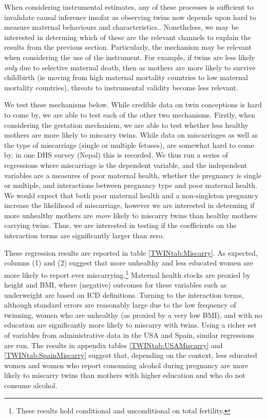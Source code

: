 \documentclass[subeqn]{article}
\begin{document}
\begin{spacing}{1.4}
When considering instrumental estimates, any of these processes is sufficient to
invalidate causal inference insofar as observing twins now depends upon hard to
measure maternal behaviours and characteristics..  Nonetheless, we may be 
interested in determing which of these are the relevant channels to explain the
results from the previous section.  Particularly, the mechanism may be relevant
when considering the use of the instrument.  For example, if twins are less 
likely \emph{only} due to selective maternal death, then as mothers are more 
likely to survive childbirth (ie moving from high maternal mortality countries 
to low maternal mortality countries), threats to instrumental validity become 
less relevant.

We test these mechanisms below.  While credible data on twin conceptions is hard 
to come by, we are able to test each of the other two mechanisms.  Firstly, when
considering the gestation mechanism, we are able to test whether less healthy
mothers are more likely to miscarry twins.  While data on miscarriages as well
as the type of miscarriage (single or multiple fetuses), are somewhat hard to 
come by, in one DHS survey (Nepal) this is recorded.  We thus run a series of 
regressions where miscarriage is the dependent variable, and the independent
variables are a measures of poor maternal health, whether the pregnancy is 
single or multiple, and interactions between pregnancy type and poor maternal 
health.  We would expect that both poor maternal health and a non-singleton
pregnancy increase the likelihood of miscarriage, however we are interested in
determing if more unhealthy mothers are \emph{more} likely to miscarry twins
than healthy mothers carrying twins.  Thus, we are interested in testing if the
coefficients on the interaction terms are significantly larger than zero.

These regression results are reported in table \ref{TWINtab:Miscarry}.  As 
expected, columns (1) and (2) suggest that more unhealthy and less educated
women are more likely to report ever miscarrying.\footnote{These results hold 
conditional and unconditional on total fertility.}  Maternal health stocks 
are proxied by height and BMI, where (negative) outcomes for these variables
such as underweight are based on ICD definitions.  Turning to the interaction
terms, although standard errors are reasonably large due to the low frequency
of twinning, women who are unhealthy (as proxied by a very low BMI), and with
no education are significantly more likely to miscarry with twins.  Using a
richer set of variables from administrative data in the USA and Spain, similar 
regressions are run.  The results in appendix tables \ref{TWINtab:USAMiscarry}
and \ref{TWINtab:SpainMiscarry} suggest that, depending on the context, less
educated women and women who report consuming alcohol during pregnancy are
more likely to miscarry twins than mothers with higher education and who do
not consume alcohol.



\end{spacing}
\end{document}
